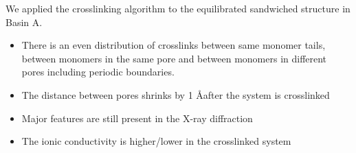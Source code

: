 \documentclass{article}
\newcommand{\angstrom}{\textup{\AA}}
\begin{document}
  We applied the crosslinking algorithm to the equilibrated sandwiched structure in 
  Basin A.
  \begin{itemize}  %
  	\item There is an even distribution of crosslinks between same monomer tails, 
	between monomers in the same pore and between monomers in different pores 
	including periodic boundaries.
	\item The distance between pores shrinks by 1 \angstrom after the system is 
	crosslinked
	\item Major features are still present in the X-ray diffraction
	\item The ionic conductivity is higher/lower in the crosslinked system
  \end{itemize}
\end{document}
